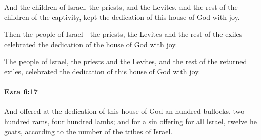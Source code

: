 			\begin{versebox}
					\item[BHS] 
					\item[LXX] 
					\item[ASV] And the children of Israel, the priests, and the Levites, and the rest of the children of the captivity, kept the dedication of this house of God with joy.
					\item[NIV] Then the people of Israel—the priests, the Levites and the rest of the exiles—celebrated the dedication of the house of God with joy.
					\item[NRSV] The people of Israel, the priests and the Levites, and the rest of the returned exiles, celebrated the dedication of this house of God with joy.
			\end{versebox}

		\paragraph{Ezra 6:17} %
			\label{EZRA-6-17}

			And offered at the dedication of this house of God an hundred bullocks, two hundred rams, four hundred lambs; and for a sin offering for all Israel, twelve he goats, according to the number of the tribes of Israel.

